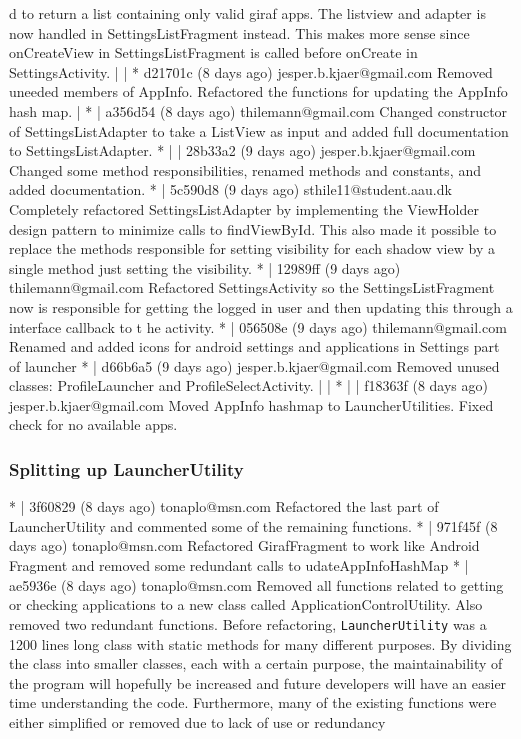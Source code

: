 d to return a list containing only valid giraf apps. The listview and adapter is now handled in SettingsListFragment instead. This makes more sense since onCreateView in SettingsListFragment is called before
 onCreate in SettingsActivity.
 | | * d21701c (8 days ago) jesper.b.kjaer@gmail.com Removed uneeded members of AppInfo. Refactored the functions for updating the AppInfo hash map.
 | * | a356d54 (8 days ago) thilemann@gmail.com Changed constructor of SettingsListAdapter to take a ListView as input and added full documentation to SettingsListAdapter.
 * | | 28b33a2 (9 days ago) jesper.b.kjaer@gmail.com Changed some method responsibilities, renamed methods and constants, and added documentation.
 * | 5c590d8 (9 days ago) sthile11@student.aau.dk Completely refactored SettingsListAdapter by implementing the ViewHolder design pattern to minimize calls to findViewById. This also made it possible to replace the methods responsible for setting visibility for each shadow view by a single method just setting the visibility.
 * | 12989ff (9 days ago) thilemann@gmail.com Refactored SettingsActivity so the SettingsListFragment now is responsible for getting the logged in user and then updating this through a interface callback to t
 he activity.
 * | 056508e (9 days ago) thilemann@gmail.com Renamed and added icons for android settings and applications in Settings part of launcher
 * | d66b6a5 (9 days ago) jesper.b.kjaer@gmail.com Removed unused classes: ProfileLauncher and ProfileSelectActivity.
 | | * | | f18363f (8 days ago) jesper.b.kjaer@gmail.com Moved AppInfo hashmap to LauncherUtilities. Fixed check for no available apps.
 
 \subsubsection{Splitting up LauncherUtility}
 * | 3f60829 (8 days ago) tonaplo@msn.com Refactored the last part of LauncherUtility and commented some of the remaining functions.
 * | 971f45f (8 days ago) tonaplo@msn.com Refactored GirafFragment to work like Android Fragment and removed some redundant calls to udateAppInfoHashMap
 * | ae5936e (8 days ago) tonaplo@msn.com Removed all functions related to getting or checking applications to a new class called ApplicationControlUtility. Also removed two redundant functions.
 Before refactoring, \lstinline!LauncherUtility! was  a 1200 lines long class with static methods for many different purposes.
 By dividing the class into smaller classes, each with a certain purpose, the maintainability of the program will hopefully be increased and future developers will have an easier time understanding the code.
 Furthermore, many of the existing functions were either simplified or removed due to lack of use or redundancy